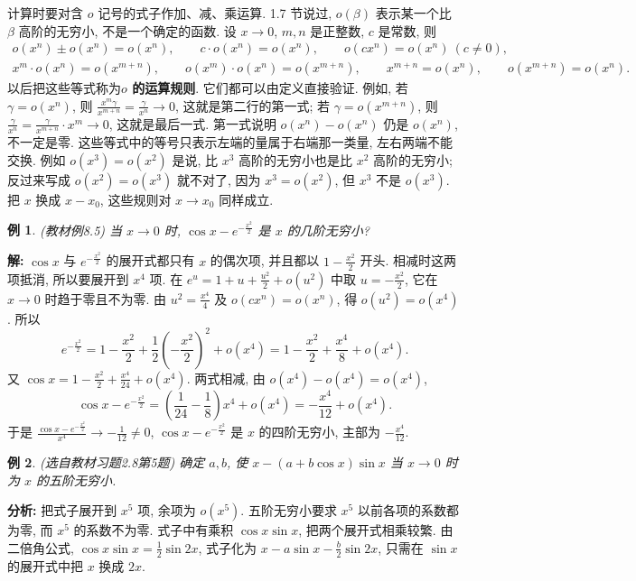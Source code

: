 \documentclass[UTF8,openany]{ctexbook}
\theoremstyle{chinesetextbook}
\newtheorem{example}{例}[section]
\newenvironment{cnsolution}{\par\indent\textbf{解:} \ignorespaces}{\par}
\begin{document}
计算时要对含 $o$ 记号的式子作加、减、乘运算. 1.7 节说过, $o(\beta)$ 表示某一个比 $\beta$ 高阶的无穷小, 不是一个确定的函数. 设 $x\to0$, $m,n$ 是正整数, $c$ 是常数, 则
\[
\begin{gathered}
o(x^n)\pm o(x^n)=o(x^n),\qquad c\cdot o(x^n)=o(x^n),\qquad o(cx^n)=o(x^n)\ (c\ne0),\\
x^m\cdot o(x^n)=o(x^{m+n}),\qquad o(x^m)\cdot o(x^n)=o(x^{m+n}),\qquad x^{m+n}=o(x^n),\qquad o(x^{m+n})=o(x^n).
\end{gathered}
\]
以后把这些等式称为\textbf{$o$ 的运算规则}. 它们都可以由定义直接验证. 例如, 若 $\gamma=o(x^n)$, 则 $\displaystyle\frac{x^m\gamma}{x^{m+n}}=\frac\gamma{x^n}\to0$, 这就是第二行的第一式; 若 $\gamma=o(x^{m+n})$, 则 $\displaystyle\frac\gamma{x^n}=\frac\gamma{x^{m+n}}\cdot x^m\to0$, 这就是最后一式. 第一式说明 $o(x^n)-o(x^n)$ 仍是 $o(x^n)$, 不一定是零. 这些等式中的等号只表示左端的量属于右端那一类量, 左右两端不能交换. 例如 $o(x^3)=o(x^2)$ 是说, 比 $x^3$ 高阶的无穷小也是比 $x^2$ 高阶的无穷小; 反过来写成 $o(x^2)=o(x^3)$ 就不对了, 因为 $x^3=o(x^2)$, 但 $x^3$ 不是 $o(x^3)$. 把 $x$ 换成 $x-x_0$, 这些规则对 $x\to x_0$ 同样成立.
\begin{example}\label{ex:c2-8-5}
\textnormal{(教材例8.5)} 当 $x\to0$ 时, $\cos x-e^{-\frac{x^2}2}$ 是 $x$ 的几阶无穷小?
\end{example}
\begin{cnsolution}
$\cos x$ 与 $e^{-\frac{x^2}2}$ 的展开式都只有 $x$ 的偶次项, 并且都以 $\displaystyle1-\frac{x^2}2$ 开头. 相减时这两项抵消, 所以要展开到 $x^4$ 项. 在 $\displaystyle e^u=1+u+\frac{u^2}2+o(u^2)$ 中取 $\displaystyle u=-\frac{x^2}2$, 它在 $x\to0$ 时趋于零且不为零. 由 $\displaystyle u^2=\frac{x^4}4$ 及 $o(cx^n)=o(x^n)$, 得 $o(u^2)=o(x^4)$. 所以
\[
e^{-\frac{x^2}2}=1-\frac{x^2}2+\frac12\left(-\frac{x^2}2\right)^2+o(x^4)=1-\frac{x^2}2+\frac{x^4}8+o(x^4).
\]
又 $\displaystyle\cos x=1-\frac{x^2}2+\frac{x^4}{24}+o(x^4)$. 两式相减, 由 $o(x^4)-o(x^4)=o(x^4)$,
\[
\cos x-e^{-\frac{x^2}2}=\left(\frac1{24}-\frac18\right)x^4+o(x^4)=-\frac{x^4}{12}+o(x^4).
\]
于是 $\displaystyle\frac{\cos x-e^{-\frac{x^2}2}}{x^4}\to-\frac1{12}\ne0$, $\cos x-e^{-\frac{x^2}2}$ 是 $x$ 的四阶无穷小, 主部为 $\displaystyle-\frac{x^4}{12}$.
\end{cnsolution}
\begin{example}\label{ex:c2-h8-5}
\textnormal{(选自教材习题2.8第5题)} 确定 $a,b$, 使 $x-(a+b\cos x)\sin x$ 当 $x\to0$ 时为 $x$ 的五阶无穷小.
\end{example}
\par\indent\textbf{分析:} 把式子展开到 $x^5$ 项, 余项为 $o(x^5)$. 五阶无穷小要求 $x^5$ 以前各项的系数都为零, 而 $x^5$ 的系数不为零. 式子中有乘积 $\cos x\sin x$, 把两个展开式相乘较繁. 由二倍角公式, $\displaystyle\cos x\sin x=\frac12\sin2x$, 式子化为 $\displaystyle x-a\sin x-\frac b2\sin2x$, 只需在 $\sin x$ 的展开式中把 $x$ 换成 $2x$.
\end{document}
